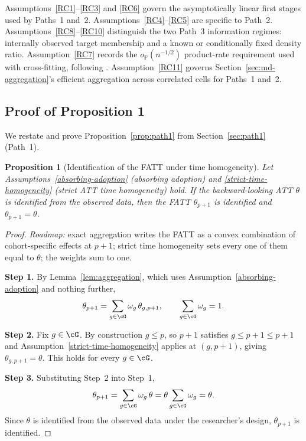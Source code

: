 \documentclass{article}
\newtheorem*{proposition*}{Proposition}
\renewcommand{\P}{\mathbb{P}}
\begin{document}
\begin{remark}
Assumptions~\ref{RC1}--\ref{RC3} and \ref{RC6} govern the asymptotically linear first stages used by Paths~1 and~2. Assumptions~\ref{RC4}--\ref{RC5} are specific to Path~2. Assumptions~\ref{RC8}--\ref{RC10} distinguish the two Path~3 information regimes: internally observed target membership and a known or conditionally fixed density ratio. Assumption~\ref{RC7} records the $o_{\P}(n^{-1/2})$ product-rate requirement used with cross-fitting, following \citet{chernozhukovDoubleDebiasedMachine2018}. Assumption~\ref{RC11} governs Section~\ref{sec:md-aggregation}'s efficient aggregation across correlated cells for Paths~1 and~2.
\end{remark}

\subsection{Proof of Proposition 1}\label{app:prop1}

We restate and prove Proposition~\ref{prop:path1} from Section~\ref{sec:path1} (Path~1).

\begin{proposition*}[Identification of the FATT under time homogeneity]
Let Assumptions~\ref{absorbing-adoption} (absorbing adoption) and \ref{strict-time-homogeneity} (strict ATT time homogeneity) hold. If the backward-looking ATT $\theta$ is identified from the observed data, then the FATT $\theta_{p+1}$ is identified and $\theta_{p+1} = \theta$.
\end{proposition*}

\begin{proof}
\textit{Roadmap:} exact aggregation writes the FATT as a convex combination of cohort-specific effects at $p+1$; strict time homogeneity sets every one of them equal to $\theta$; the weights sum to one.

\textbf{Step 1.} By Lemma~\ref{lem:aggregation}, which uses Assumption~\ref{absorbing-adoption} and nothing further,
\[
\theta_{p+1} = \sum_{g \in \cG} \omega_g\, \theta_{g,p+1}, \qquad \sum_{g \in \cG} \omega_g = 1.
\]

\textbf{Step 2.} Fix $g \in \cG$. By construction $g \leq p$, so $p+1$ satisfies $g \leq p+1 \leq p+1$ and Assumption~\ref{strict-time-homogeneity} applies at $(g,p+1)$, giving $\theta_{g,p+1} = \theta$. This holds for every $g \in \cG$.

\textbf{Step 3.} Substituting Step~2 into Step~1,
\[
\theta_{p+1} = \sum_{g \in \cG} \omega_g\, \theta = \theta \sum_{g \in \cG} \omega_g = \theta.
\]
Since $\theta$ is identified from the observed data under the researcher's design, $\theta_{p+1}$ is identified.
\end{proof}
\end{document}
